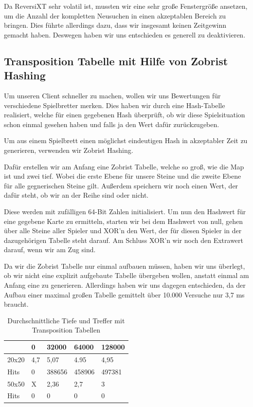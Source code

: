 \documentclass[12pt,a4paper,bibliography=totocnumbered,listof=totocnumbered]{article}
\begin{document}
Da ReversiXT sehr volatil ist, mussten wir eine sehr große Fenstergröße ansetzen, um die Anzahl der kompletten Neusuchen in einen akzeptablen Bereich zu bringen. Dies führte allerdings dazu, dass wir insgesamt keinen Zeitgewinn gemacht haben.
Deswegen haben wir uns entschieden es generell zu deaktivieren.

\subsection{Transposition Tabelle mit Hilfe von Zobrist Hashing}
Um unseren Client schneller zu machen, wollen wir uns Bewertungen für verschiedene Spielbretter merken.
Dies haben wir durch eine Hash-Tabelle realisiert, welche für einen gegebenen Hash überprüft, ob wir diese Spielsituation schon einmal gesehen haben und falls ja den Wert dafür zurückzugeben.

Um aus einem Spielbrett einen möglichst eindeutigen Hash in akzeptabler Zeit zu generieren, verwenden wir Zobrist Hashing.

Dafür erstellen wir am Anfang eine Zobrist Tabelle, welche so groß, wie die Map ist und zwei tief. Wobei die erste Ebene für unsere Steine und die zweite Ebene für alle gegnerischen Steine gilt. Außerdem speichern wir noch einen Wert, der dafür steht, ob wir an der Reihe sind oder nicht.

Diese werden mit zufälligen 64-Bit Zahlen initialisiert.
Um nun den Hashwert für eine gegebene Karte zu ermitteln, starten wir bei dem Hashwert von null, gehen über alle Steine aller Spieler und XOR'n den Wert, der für diesen Spieler in der dazugehörigen Tabelle steht darauf. Am Schluss XOR'n wir noch den Extrawert darauf, wenn wir am Zug sind.

Da wir die Zobrist Tabelle nur einmal aufbauen müssen, haben wir uns überlegt, ob wir nicht eine explizit aufgebaute Tabelle übergeben wollen, anstatt einmal am Anfang eine zu generieren. Allerdings haben wir uns dagegen entschieden, da der Aufbau einer maximal großen Tabelle gemittelt über 10.000 Versuche nur 3,7 ms braucht.


  \begin{table}[!h]
\centering
	\begin{tabular} {| m{1.7cm} | m{3cm} | m{3cm} | m{3cm} | m{3cm}|}
		\hline
		\textbf{} &\textbf{0} &\textbf{32000} & \textbf{64000} & \textbf{128000}\\
		\hline
		20x20 & 4,7 & 5,07 & 4.95 & 4,95 \\
		\hline
		Hits & 0 & 388656 & 458906 & 497381 \\
		\hline
		50x50 & X & 2,36 & 2,7 & 3 \\
		\hline
		Hits & 0 & 0 & 0 & 0 \\
		\hline
	\end{tabular}
	\caption{Durchschnittliche Tiefe und Treffer mit Transposition Tabellen}
	\label{tab:tasks}
\end{table}
\end{document}
